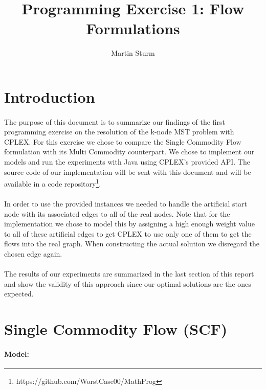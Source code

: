 \documentclass{article}
\begin{document}
\title{Programming Exercise 1: Flow Formulations}
\author{Martin Sturm}
\maketitle
              
\section{Introduction}
\paragraph{} The purpose of this document is to summarize our findings of the first programming exercise on the resolution of the k-node MST problem with CPLEX. For this exercise we chose to compare the Single Commodity Flow formulation with its Multi Commodity counterpart. We chose to implement our models and run the experiments with Java using CPLEX's provided API. The source code of our implementation will be sent with this document and will be available in a code repository\footnote{https://github.com/WorstCase00/MathProg}.\\
\paragraph{} In order to use the provided instances we needed to handle the artificial start node with its associated edges to all of the real nodes. Note that for the implementation we chose to model this by assigning a high enough weight value to all of these artificial edges to get CPLEX to use only one of them to get the flows into the real graph. When constructing the actual solution we disregard the chosen edge again.\\
\paragraph{} The results of our experiments are summarized in the last section of this report and show the validity of this approach since our optimal solutions are the ones expected.

\section{Single Commodity Flow (SCF)}

\paragraph{Model:}
\newcommand{\binaries}{\{0, 1\}}
\newcommand{\edgesum}{\displaystyle \sum_{(i, j) \in E}}
\newcommand{\nodesum}{\displaystyle \sum_{i \in V^+}}
\newcommand{\vflow}{F_{ij}}
\newcommand{\vflowrev}{F_{ji}}
\newcommand{\vedge}{X_{ij}}
\newcommand{\vnode}{X_{i}}
\end{document}
